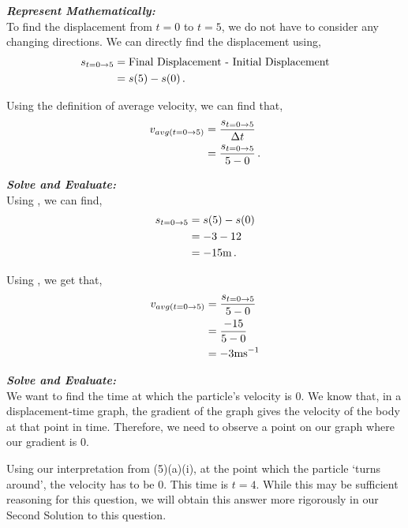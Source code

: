 \begin{subquestions}
\begin{subsubquestions}
\begin{subsubsubquestions}
\textbf{\textit{Represent Mathematically:}} \\
To find the displacement from $t=0$ to $t=5$, we do not have to consider any changing directions. We can directly find the displacement using,
\begin{align}
	s_{t=0 \rightarrow 5} & = \text{Final Displacement - Initial Displacement} \nonumber \\
	                      & =  s(5)-s(0) \,. \label{2014:q5:Seqn4} 
\end{align}

Using the definition of average velocity, we can find that,
\begin{align}
	v_{avg(t=0 \rightarrow 5)} & = \frac{s_{t=0 \rightarrow 5}}{\Delta t} \nonumber \\
	                           & = \frac{s_{t=0 \rightarrow 5}}{5-0} \,. \label{2014:q5:Seqn5}
\end{align}

\textbf{\textit{Solve and Evaluate:}} \\
Using , we can find,
\begin{align}
	s_{t=0 \rightarrow 5} & =  s(5)-s(0) \nonumber \\
	                      & = -3 - 12 \nonumber \\
	                      & = -15 \text{m} \,.
\end{align}

Using , we get that,
\begin{align}
	v_{avg(t=0 \rightarrow 5)} & =\frac{s_{t=0 \rightarrow 5}}{5-0} \nonumber \\
								 & = \frac{-15}{5-0} \nonumber \\
								 & = -3 \text{ms}^{-1} 
\end{align}


\subsubsubquestion

\textbf{\textit{Solve and Evaluate:}} \\
We want to find the time at which the particle's velocity is 0. We know that, in a displacement-time graph, the gradient of the graph gives the velocity of the body at that point in time. Therefore, we need to observe a point on our graph where our gradient is 0. 

Using our interpretation from (5)(a)(i), at the point which the particle `turns around', the velocity has to be 0. This time is $t=4$. While this may be sufficient reasoning for this question, we will obtain this answer more rigorously in our Second Solution to this question. \\


\end{subsubsubquestions}
\end{subsubquestions}
\end{subquestions}
